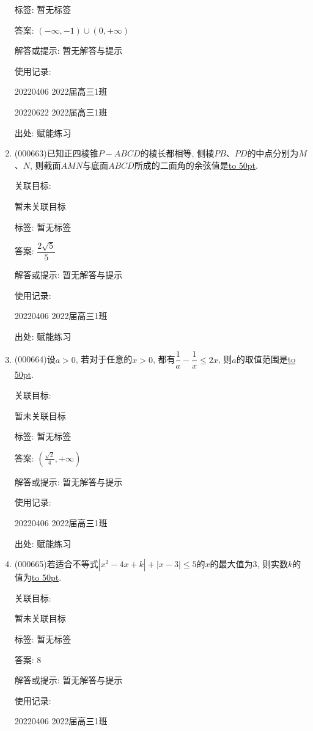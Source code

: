 \documentclass[10pt,a4paper]{article}
\newcommand{\blank}[1]{\underline{\hbox to #1pt{}}}
\begin{document}
\begin{enumerate}[1.]
标签: 暂无标签

答案: $(-\infty ,-1)\cup (0,+\infty)$

解答或提示: 暂无解答与提示

使用记录:

20220406	2022届高三1班	

20220622	2022届高三1班  	


出处: 赋能练习
\item { (000663)}已知正四棱锥$P-ABCD$的棱长都相等, 侧棱$PB$、$PD$的中点分别为$M$、$N$, 则截面$AMN$与底面$ABCD$所成的二面角的余弦值是\blank{50}.


关联目标:

暂未关联目标



标签: 暂无标签

答案: $\dfrac{2\sqrt 5}5$

解答或提示: 暂无解答与提示

使用记录:

20220406	2022届高三1班	


出处: 赋能练习
\item { (000664)}设$a>0$, 若对于任意的$x>0$, 都有$\dfrac1a-\dfrac1x\le 2x$, 则$a$的取值范围是\blank{50}.


关联目标:

暂未关联目标



标签: 暂无标签

答案: $(\frac{\sqrt 2}4,+\infty)$

解答或提示: 暂无解答与提示

使用记录:

20220406	2022届高三1班	


出处: 赋能练习
\item { (000665)}若适合不等式$|x^2-4x+k|+|x-3|\le 5$的$x$的最大值为$3$, 则实数$k$的值为\blank{50}.


关联目标:

暂未关联目标



标签: 暂无标签

答案: $8$

解答或提示: 暂无解答与提示

使用记录:

20220406	2022届高三1班	



\end{enumerate}
\end{document}
